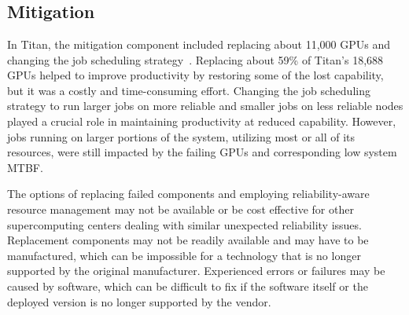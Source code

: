 \section{}
\label{section:discussion}


\subsection{Mitigation}
\label{section:mitigation}

In Titan, the mitigation component included replacing about 11,000 GPUs and
changing the job scheduling strategy~\cite{8665764}. Replacing about 59\% of
Titan's 18,688 GPUs helped to improve productivity by restoring some of the lost
capability, but it was a costly and time-consuming effort. Changing the job
scheduling strategy to run larger jobs on more reliable and smaller jobs on less
reliable nodes played a crucial role in maintaining productivity at reduced
capability. However, jobs running on larger portions of the system, utilizing
most or all of its resources, were still impacted by the failing GPUs and
corresponding low system MTBF.

The options of replacing failed components and employing reliability-aware
resource management may not be available or be cost effective for other
supercomputing centers dealing with similar unexpected reliability issues.
%
Replacement components may not be readily available and may have to be
manufactured, which can be impossible for a technology that is no longer supported
by the original manufacturer. Experienced errors or failures may be caused by
software, which can be difficult to fix if the software itself or the deployed
version is no longer supported by the vendor.

